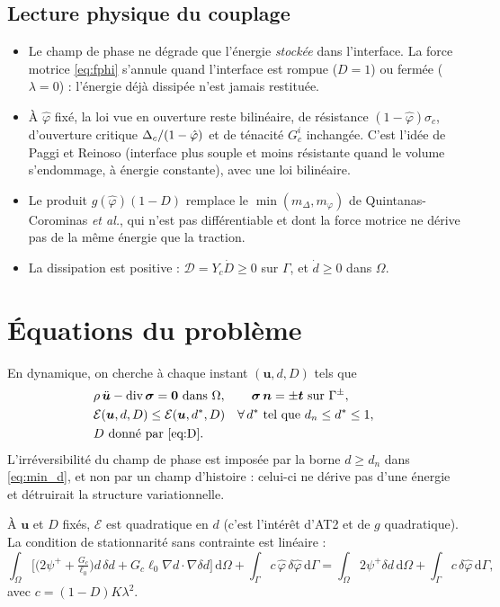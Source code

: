 \documentclass[11pt,a4paper]{article}
\newcommand{\bu}{\bm{u}}\newcommand{\bq}{\bm{q}}\newcommand{\bt}{\bm{t}}
\newcommand{\phib}{\hat\varphi}
\newcommand{\dd}{\,\mathrm{d}}
\begin{document}
\subsection{Lecture physique du couplage}
\begin{itemize}
\item Le champ de phase ne dégrade que l'énergie \emph{stockée} dans l'interface. La force motrice
\eqref{eq:fphi} s'annule quand l'interface est rompue ($D=1$) ou fermée ($\lambda=0$) : l'énergie déjà
dissipée n'est jamais restituée.
\item À $\phib$ fixé, la loi vue en ouverture reste bilinéaire, de résistance $(1-\phib)\sigma_c$,
d'ouverture critique $\Dc/(1-\phib)$ et de ténacité $G_c^i$ inchangée. C'est l'idée de Paggi et Reinoso
(interface plus souple et moins résistante quand le volume s'endommage, à énergie constante), avec une
loi bilinéaire.
\item Le produit $g(\phib)(1-D)$ remplace le $\min(m_\Delta,m_\varphi)$ de Quintanas-Corominas
\emph{et al.}, qui n'est pas différentiable et dont la force motrice ne dérive pas de la même énergie
que la traction.
\item La dissipation est positive : $\mathcal{D}=Y_c\dot D\ge0$ sur $\Gamma$, et $\dot d\ge 0$ dans $\Omega$.
\end{itemize}

\section{Équations du problème}
En dynamique, on cherche à chaque instant $(\bu,d,D)$ tels que
\begin{align}
&\rho\,\ddot{\bu}-\mathrm{div}\,\bsig=\bm{0}\ \text{dans }\Omega,\qquad \bsig\,\bm{n}=\pm\bt\ \text{sur }\Gamma^\pm, \label{eq:mvt}\\
&\mathcal{E}(\bu,d,D)\le\mathcal{E}(\bu,d^*,D)\quad\forall\, d^*\ \text{tel que } d_n\le d^*\le 1, \label{eq:min_d}\\
&D\ \text{donné par \eqref{eq:D}}. \nonumber
\end{align}
L'irréversibilité du champ de phase est imposée par la borne $d\ge d_n$ dans \eqref{eq:min_d}, et non par
un champ d'histoire : celui-ci ne dérive pas d'une énergie et détruirait la structure variationnelle.

À $\bu$ et $D$ fixés, $\mathcal{E}$ est quadratique en $d$ (c'est l'intérêt d'AT2 et de $g$ quadratique).
La condition de stationnarité sans contrainte est linéaire :
\begin{equation}
\int_\Omega\Big[\big(2\psi^++\tfrac{G_c}{\ell_0}\big)d\,\delta d+G_c\ell_0\nabla d\cdot\nabla\delta d\Big]\dd\Omega
+\int_\Gamma c\,\phib\,\delta\phib\dd\Gamma
=\int_\Omega 2\psi^+\delta d\dd\Omega+\int_\Gamma c\,\delta\phib\dd\Gamma,
\label{eq:d_faible}
\end{equation}
avec $c=(1-D)K\lambda^2$.
\end{document}
